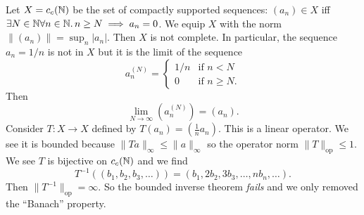 \begin{example}
Let $X=c_{c}(\mathbb{N})$ be the set of compactly supported sequences:
$(a_{n})\in X$ iff $\exists N\in\mathbb{N}\forall n\in\mathbb{N}\ldotp n\geq N\implies a_{n}=0$.
We equip $X$ with the norm $\|(a_{n})\|=\sup_{n}|a_{n}|$.
Then $X$ is not complete. In particular, the sequence $a_{n}=1/n$ is
not in $X$ but it is the limit of the sequence
\begin{equation}
a^{(N)}_{n}=\begin{cases}
1/n & \mbox{if }n<N\\
0 & \mbox{if }n\geq N.
\end{cases}
\end{equation}
Then
\begin{equation}
\lim_{N\to\infty}(a^{(N)}_{n})=(a_{n}).
\end{equation}
Consider $T\colon X\to X$ defined by $T(a_{n})=(\frac{1}{n}a_{n})$.
This is a linear operator. We see it is bounded because
$\|Ta\|_{\infty}\leq\|a\|_{\infty}$ so the operator norm $\|T\|_{\text{op}}\leq1$.
We see $T$ is bijective on $c_{c}(\mathbb{N})$ and we find
\begin{equation}
T^{-1}((b_{1},b_{2},b_{3},\dots))=(b_{1},2b_{2},3b_{3},\dots,nb_{n},\dots).
\end{equation}
Then $\|T^{-1}\|_{\text{op}}=\infty$. So the bounded inverse theorem
\emph{fails} and we only removed the ``Banach'' property.
\end{example}